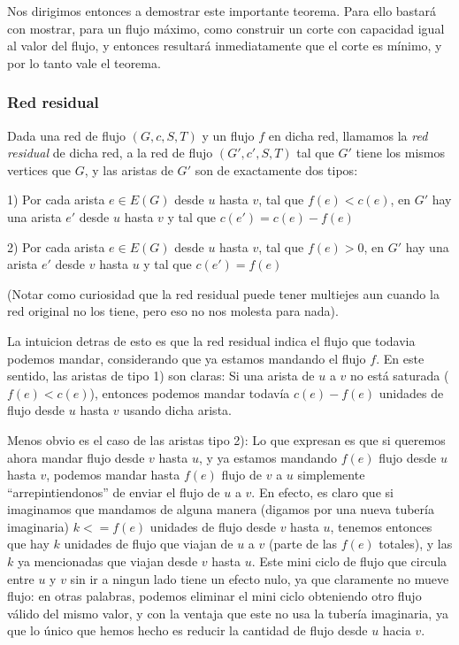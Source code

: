 \documentclass{article}
\begin{document}
Nos dirigimos entonces a demostrar este importante teorema. Para ello bastará con mostrar, para un flujo máximo, como construir un corte
con capacidad igual al valor del flujo, y entonces resultará inmediatamente que el corte es mínimo, y por lo tanto vale el teorema.

\subsubsection{Red residual}

Dada una red de flujo $(G,c,S,T)$ y un flujo $f$ en dicha red, llamamos la \textit{red residual} de dicha red, a la red de flujo
$(G', c', S, T)$ tal que $G'$ tiene los mismos vertices que $G$, y las aristas de $G'$ son de exactamente dos tipos:

1) Por cada arista $e \in E(G)$ desde $u$ hasta $v$, tal que $f(e) < c(e)$, en $G'$ hay una arista $e'$ desde $u$ hasta $v$ y tal que
$c(e') = c(e) - f(e)$

2) Por cada arista $e \in E(G)$ desde $u$ hasta $v$, tal que $f(e) > 0$, en $G'$ hay una arista $e'$ desde $v$ hasta $u$ y tal que
$c(e') = f(e)$

(Notar como curiosidad que la red residual puede tener multiejes aun cuando la red original no los tiene, pero eso no nos molesta para nada).

La intuicion detras de esto es que la red residual indica el flujo que todavia podemos mandar, considerando que ya estamos mandando el flujo
$f$. En este sentido, las aristas de tipo 1) son claras: Si una arista de $u$ a $v$ no está saturada ($f(e) < c(e)$), entonces podemos mandar todavía
$c(e) - f(e)$ unidades de flujo desde $u$ hasta $v$ usando dicha arista.

Menos obvio es el caso de las aristas tipo 2): Lo que expresan es que si queremos ahora mandar flujo desde $v$ hasta $u$, y ya estamos mandando
$f(e)$ flujo desde $u$ hasta $v$, podemos mandar hasta $f(e)$ flujo de $v$ a $u$ simplemente ``arrepintiendonos'' de enviar el flujo de
$u$ a $v$. En efecto, es claro que si imaginamos que mandamos de alguna manera (digamos por una nueva tubería imaginaria) $k <= f(e)$
unidades de flujo desde $v$ hasta $u$, tenemos entonces que hay $k$ unidades de flujo que viajan de $u$ a $v$ (parte de las $f(e)$ totales),
y las $k$ ya mencionadas que viajan desde $v$ hasta $u$. Este mini ciclo de flujo que circula entre $u$ y $v$ sin ir a ningun lado tiene un
efecto nulo, ya que claramente no mueve flujo: en otras palabras, podemos eliminar el mini ciclo obteniendo otro flujo válido del mismo valor,
y con la ventaja que este no usa la tubería imaginaria, ya que lo único que hemos hecho es reducir la cantidad de flujo desde $u$ hacia $v$.
\end{document}
